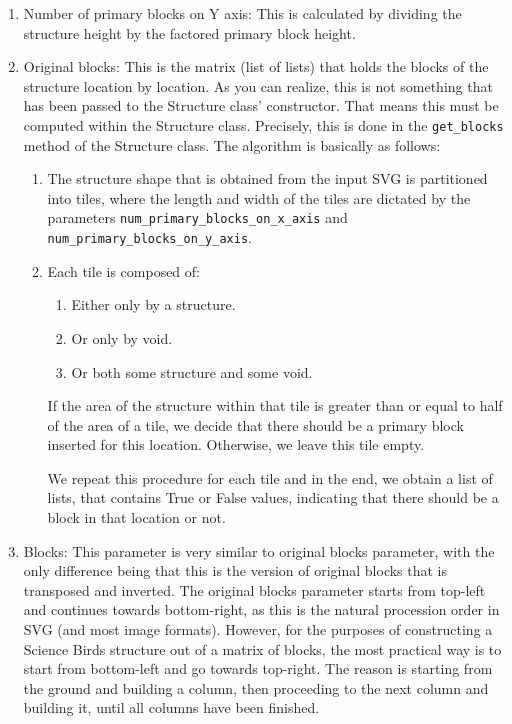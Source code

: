 \documentclass{dalthesis}
\begin{document}
\begin{enumerate}
\begin{enumerate}
    \item Number of primary blocks on Y axis: This is calculated by dividing the structure height by the factored primary block height.
    \item Original blocks: This is the matrix (list of lists) that holds the blocks of the structure location by location. As you can realize, this is not something that has been passed to the Structure class' constructor. That means this must be computed within the Structure class. Precisely, this is done in the \lstinline{get_blocks} method of the Structure class. The algorithm is basically as follows:

    \begin{enumerate}
      \item The structure shape that is obtained from the input SVG is partitioned into tiles, where the length and width of the tiles are dictated by the parameters \lstinline{num_primary_blocks_on_x_axis} and \lstinline{num_primary_blocks_on_y_axis}.
      \item Each tile is composed of:

      \begin{enumerate}
        \item Either only by a structure.
        \item Or only by void.
        \item Or both some structure and some void.
      \end{enumerate}

      If the area of the structure within that tile is greater than or equal to half of the area of a tile, we decide that there should be a primary block inserted for this location. Otherwise, we leave this tile empty.

      We repeat this procedure for each tile and in the end, we obtain a list of lists, that contains True or False values, indicating that there should be a block in that location or not.
    \end{enumerate}

    \item Blocks: This parameter is very similar to original blocks parameter, with the only difference being that this is the version of original blocks that is transposed and inverted. The original blocks parameter starts from top-left and continues towards bottom-right, as this is the natural procession order in SVG (and most image formats). However, for the purposes of constructing a Science Birds structure out of a matrix of blocks, the most practical way is to start from bottom-left and go towards top-right. The reason is starting from the ground and building a column, then proceeding to the next column and building it, until all columns have been finished.


\end{enumerate}
\end{enumerate}
\end{document}
